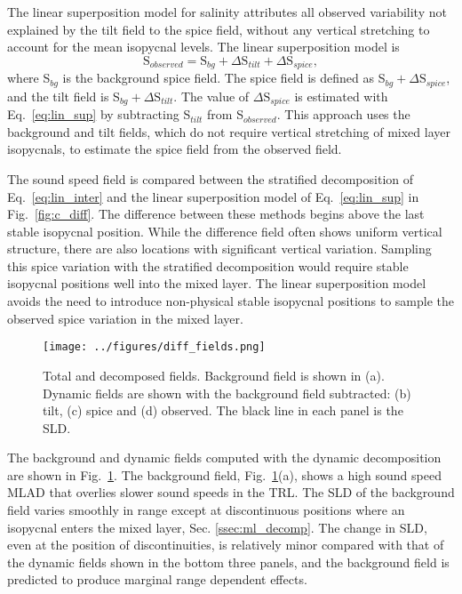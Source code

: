 \documentclass[preprint,NumberedRefs]{JASA}
\begin{document}
The linear superposition model for salinity attributes all observed variability not explained by the tilt field to the spice field, without any vertical stretching to account for the mean isopycnal levels. The linear superposition model is
\begin{equation}
    \textrm{S}_{observed} = \textrm{S}_{bg} + \Delta \textrm{S}_{tilt} + \Delta \textrm{S}_{spice},
    \label{eq:lin_sup}
\end{equation}
where S$_{bg}$ is the background spice field. The spice field is defined as S$_{bg} + \Delta \textrm{S}_{spice}$, and the tilt field is S$_{bg} + \Delta \textrm{S}_{tilt}$. The value of $\Delta \textrm{S}_{spice}$ is estimated with Eq.~\eqref{eq:lin_sup} by subtracting S$_{tilt}$ from S$_{observed}$. This approach uses the background and tilt fields, which do not require vertical stretching of mixed layer isopycnals, to estimate the spice field from the observed field.

The sound speed field is compared between the stratified decomposition of Eq.~\eqref{eq:lin_inter} and the linear superposition model of Eq.~\eqref{eq:lin_sup} in Fig.~\ref{fig:c_diff}. The difference between these methods begins above the last stable isopycnal position. While the difference field often shows uniform vertical structure, there are also locations with significant vertical variation. Sampling this spice variation with the stratified decomposition would require stable isopycnal positions well into the mixed layer. The linear superposition model avoids the need to introduce non-physical stable isopycnal positions to sample the observed spice variation in the mixed layer.

\begin{figure}
\texttt{[image: ../figures/diff\_fields.png]}
        \caption{\label{fig:c_fields}{Total and decomposed fields. Background field is shown in (a). Dynamic fields are shown with the background field subtracted: (b) tilt, (c) spice and (d) observed. The black line in each panel is the SLD.}}
\end{figure}

The background and dynamic fields computed with the dynamic decomposition are shown in Fig.~\ref{fig:c_fields}. The background field, Fig.~\ref{fig:c_fields}(a), shows a high sound speed MLAD that overlies slower sound speeds in the TRL. The SLD of the background field varies smoothly in range except at discontinuous positions where an isopycnal enters the mixed layer, Sec. \ref{ssec:ml_decomp}. The change in SLD, even at the position of discontinuities, is relatively minor compared with that of the dynamic fields shown in the bottom three panels, and the background field is predicted to produce marginal range dependent effects.
\end{document}
